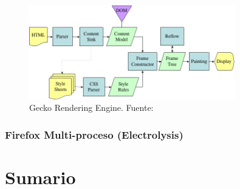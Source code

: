          \begin{figure}[h!t]
            \centering
             \includegraphics[width=0.8\textwidth]{figures/Gecko_Overview_9.png}
             \caption{Gecko Rendering Engine. Fuente: \cite{gecko}}
             \label{fig:Gecko}
         \end{figure}
    \subsubsection{Firefox Multi-proceso (Electrolysis)} 

            

\section{Sumario}
\label{chap3:Summ}




%     
%     







